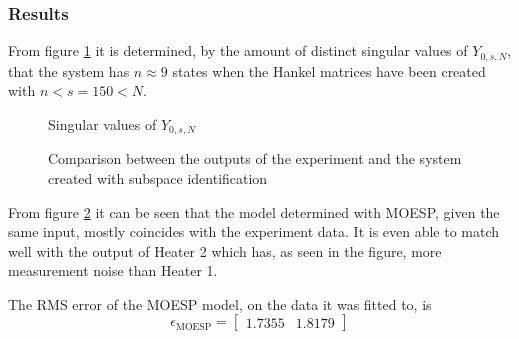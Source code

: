 \subsubsection{Results}
From figure \ref{fig:SingularY0sN} it is determined, by the amount of distinct singular values of $Y_{0,s,N}$, that the system has $n \approx 9$ states when the Hankel matrices have been created with $n < s = 150 < N$.
\begin{figure}[ht]
    \centering
    
    \caption{Singular values of $Y_{0,s,N}$}
    \label{fig:SingularY0sN}
\end{figure}
\begin{figure}[ht]
    \centering
    
    \caption{Comparison between the outputs of the experiment and the system created with subspace identification}
    \label{fig:Comp_subID}
\end{figure}
From figure \ref{fig:Comp_subID} it can be seen that the model determined with MOESP, given the same input, mostly coincides with the experiment data. It is even able to match well with the output of Heater 2 which has, as seen in the figure, more measurement noise than Heater 1.

The RMS error of the MOESP model, on the data it was fitted to, is
$$
\epsilon_{\text{MOESP}} = \begin{bmatrix} 1.7355 & 1.8179\end{bmatrix}
$$
